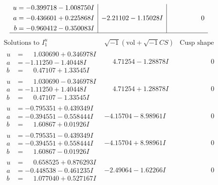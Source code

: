 \documentclass[1p]{elsarticle_modified}
\theoremstyle{definition}
\newcommand{\I}{\sqrt{-1}}
\begin{document}
$$\begin{array}{c|c|c}
\begin{aligned}
u &= -0.399718 - 1.008750 I \\
a &= -0.436601 + 0.225868 I \\
b &= -0.960412 - 0.350083 I\end{aligned}
 & -2.21102 - 1.15028 I & \phantom{-0.000000 } 0\\
 \hline 
 \end{array}$$\newpage$$\begin{array}{c|c|c}  
\text{Solutions to }I^u_{1}& \I (\text{vol} + \sqrt{-1}CS) & \text{Cusp shape}\\
 \hline 
\begin{aligned}
u &= \phantom{-}1.030690 + 0.346978 I \\
a &= -1.11250 - 1.40448 I \\
b &= \phantom{-}0.47107 + 1.33545 I\end{aligned}
 & \phantom{-}4.71254 - 1.28878 I & \phantom{-0.000000 } 0 \\ \hline\begin{aligned}
u &= \phantom{-}1.030690 - 0.346978 I \\
a &= -1.11250 + 1.40448 I \\
b &= \phantom{-}0.47107 - 1.33545 I\end{aligned}
 & \phantom{-}4.71254 + 1.28878 I & \phantom{-0.000000 } 0 \\ \hline\begin{aligned}
u &= -0.795351 + 0.439349 I \\
a &= -0.394551 - 0.558444 I \\
b &= \phantom{-}1.60867 + 0.01926 I\end{aligned}
 & -4.15704 - 8.98961 I & \phantom{-0.000000 } 0 \\ \hline\begin{aligned}
u &= -0.795351 - 0.439349 I \\
a &= -0.394551 + 0.558444 I \\
b &= \phantom{-}1.60867 - 0.01926 I\end{aligned}
 & -4.15704 + 8.98961 I & \phantom{-0.000000 } 0 \\ \hline\begin{aligned}
u &= \phantom{-}0.658525 + 0.876293 I \\
a &= -0.448538 - 0.461235 I \\
b &= \phantom{-}1.077040 + 0.527167 I\end{aligned}
 & -2.49064 - 1.62266 I & \phantom{-0.000000 } 0 \\ \hline\begin{aligned}

\end{aligned}
\end{array}$$
\end{document}
